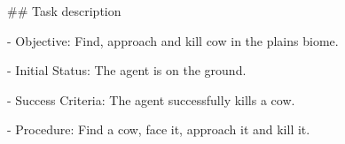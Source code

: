 

\#\# Task description

- Objective: Find, approach and kill cow in the plains biome.

- Initial Status: The agent is on the ground.

- Success Criteria: The agent successfully kills a cow.

- Procedure: Find a cow, face it, approach it and kill it.


